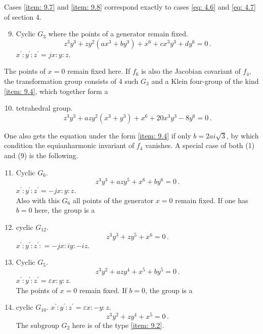 \documentclass[leqno]{article}
\begin{document}
Cases \ref{item: 9.7} and \ref{item: 9.8} correspond exactly to cases \eqref{eq: 4.6} and \eqref{eq: 4.7} of section 4.
\begin{enumerate}[label=\arabic*)]
    \setcounter{enumi}{8}
    \item \label{item: 9.9}Cyclic $G_3$ where the points of a generator remain fixed.
    \begin{equation}\label{eq: 9.9}
        z^3 y^3 + z y^2 (ax^3 + by^3) + x^6 + c x^3 y^3 + d y^6 = 0 \, . \tag{9}
    \end{equation}
    $x^\prime : y^\prime : z^\prime = jx : y : z$. 
\end{enumerate}
The points of $x=0$ remain fixed here. If $f_6$ is also the Jacobian covariant of $f_4$, the transformation group consists of 4 such $G_3$ and a Klein four-group of the kind \ref{item: 9.4}, which together form a
\begin{enumerate}[label=\arabic*)]
    \setcounter{enumi}{9}
    \item \label{item: 9.10}tetrahedral group. 
    \begin{equation}\label{eq: 9.10}
        z^3 y^3 + a z y^2(x^3 + y^3) + x^6 + 20x^3 y^3-8y^6 = 0 \, . \tag{10}
    \end{equation}
\end{enumerate}
One also gets the equation under the form \ref{item: 9.4} if only $b=2ai\sqrt{3}$, by which condition the equianharmonic invariant of $f_4$ vanishes. A special case of both (1) and (9) is the following.
\begin{enumerate}[label=\arabic*)]
    \setcounter{enumi}{10}
    \item \label{item: 9.11}Cyclic $G_6$.
    \begin{equation}\label{eq: 9.11}
        z^3 y^3 + a z y^5 + x^6 + b y^6 = 0 \, . \tag{11}
    \end{equation}
    $x^\prime : y^\prime : z^\prime = -jx : y: z$. \\
     Also with this $G_6$ all points of the generator $x=0$ remain fixed. If one has $b=0$ here, the group is a 
	\item cyclic $G_{12}$.
	\begin{equation}\label{eq: 9.12}
	z^3 y^3 + zy^5 + x^6 = 0 \, . \tag{12}
	\end{equation}
	$x^\prime : y^\prime : z^\prime: = -jx : iy : -iz$. 
	\item Cyclic $G_5$.
	\begin{equation}\label{eq: 9.13}
	z^3 y^2 + azy^4 + x^5 + by^5 = 0 \, . \tag{13}
	\end{equation}
	$x^\prime : y^\prime : z^\prime = \varepsilon x : y: z$. \\
	The points of $x=0$ remain fixed. If $b=0$, the group is a 
	\item cyclic $G_{10}$. $x^\prime : y^\prime : z^\prime = \varepsilon x : -y : z$. 
	\begin{equation}\label{eq: 9.14}
	z^3 y^2 + zy^4 + x^5 = 0 \, . \tag{14}
	\end{equation}
	The subgroup $G_2$ here is of the type \ref{item: 9.2}. 
\end{enumerate}
\end{document}

